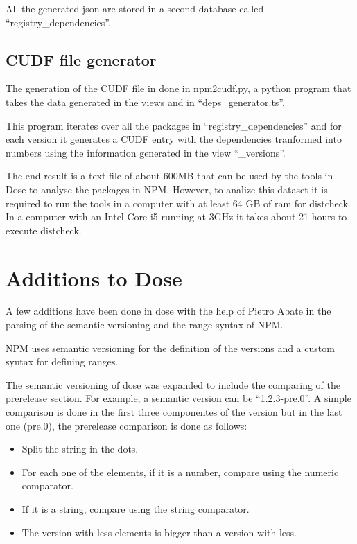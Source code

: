\documentclass[letterpaper,12pt]{report}
\begin{document}
All the generated json are stored in a second database called
``registry\_dependencies''.



\subsection{CUDF file generator}

The generation of the CUDF file in done in npm2cudf.py, a python program that
takes the data generated in the views and in ``deps\_generator.ts''.

This program iterates over all the packages in ``registry\_dependencies'' and
for each version it generates a CUDF entry with the dependencies tranformed into
numbers using the information generated in the view ``\_versions''.

The end result is a text file of about 600MB that can be used by the tools in
Dose to analyse the packages in NPM. However, to analize this dataset it is
required to run the tools in a computer with at least 64 GB of ram for
distcheck. In a computer with an Intel Core i5 running at 3GHz it takes about 21
hours to execute distcheck.


\section{Additions to Dose}

A few additions have been done in dose with the help of Pietro Abate in the
parsing of the semantic versioning and the range syntax of NPM.

NPM uses semantic versioning for the definition of the versions and a custom
syntax for defining ranges.

The semantic versioning of dose was expanded to include the comparing of the
prerelease section. For example, a semantic version can be ``1.2.3-pre.0''. A
simple comparison is done in the first three componentes of the version but in
the last one (pre.0), the prerelease comparison is done as follows:

\begin{itemize}
  \item Split the string in the dots.
  \item For each one of the elements, if it is a number, compare using the
    numeric comparator.
  \item If it is a string, compare using the string comparator.
  \item The version with less elements is bigger than a version with less.
\end{itemize}
\end{document}
